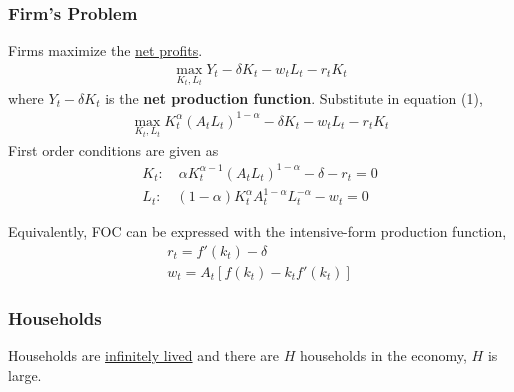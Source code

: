 \documentclass[11pt]{article}
\begin{document}
			\subsubsection{Firm's Problem}
				\par Firms maximize the \ul{net profits}.
				\begin{gather}
					\max_{K_t, L_t} Y_t - \delta K_t - w_t L_t - r_t K_t
				\end{gather}
				where $Y_t - \delta K_t$ is the \textbf{net production function}. Substitute in equation (1),
				\begin{gather}
					\max_{K_t, L_t} K_t^\alpha (A_t L_t)^{1-\alpha} - \delta K_t - w_t L_t - r_t K_t
				\end{gather}
				First order conditions are given as
				\begin{gather}
					K_t:\quad \alpha K_t^{\alpha - 1} (A_t L_t)^{1-\alpha} - \delta - r_t = 0 \\
					L_t:\quad (1-\alpha) K_t^\alpha A_t ^{1-\alpha} L_t^{-\alpha} - w_t = 0
				\end{gather}
				\begin{remark}
					Equivalently, FOC can be expressed with the intensive-form production function,
					\begin{gather}
						r_t = f'(k_t) - \delta\\
						w_t = A_t [f(k_t) - k_t f'(k_t)]
					\end{gather}
				\end{remark}
			\subsubsection{Households}
				\par Households are \ul{infinitely lived} and there are $H$ households in the economy, $H$ is large.
\end{document}
